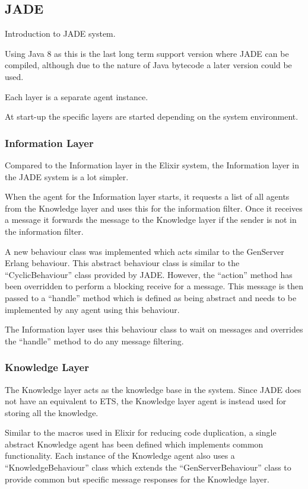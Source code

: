 \subsection{JADE}

Introduction to JADE system.

Using Java 8 as this is the last long term support version where JADE can be compiled, although due to the nature of Java bytecode a later version could be used.

Each layer is a separate agent instance.

At start-up the specific layers are started depending on the system environment.

\subsubsection{Information Layer}

Compared to the Information layer in the Elixir system, the Information layer in the JADE system is a lot simpler.

When the agent for the Information layer starts, it requests a list of all agents from the Knowledge layer and uses this for the information filter.
Once it receives a message it forwards the message to the Knowledge layer if the sender is not in the information filter.

A new behaviour class was implemented which acts similar to the GenServer Erlang behaviour.
This abstract behaviour class is similar to the ``CyclicBehaviour'' class provided by JADE\@.
However, the ``action'' method has been overridden to perform a blocking receive for a message.
This message is then passed to a ``handle'' method which is defined as being abstract and needs to be implemented by any agent using this behaviour.

The Information layer uses this behaviour class to wait on messages and overrides the ``handle'' method to do any message filtering.

\subsubsection{Knowledge Layer}

The Knowledge layer acts as the knowledge base in the system.
Since JADE does not have an equivalent to ETS, the Knowledge layer agent is instead used for storing all the knowledge.

Similar to the macros used in Elixir for reducing code duplication, a single abstract Knowledge agent has been defined which implements common functionality.
Each instance of the Knowledge agent also uses a ``KnowledgeBehaviour'' class which extends the ``GenServerBehaviour'' class to provide common but specific message responses for the Knowledge layer.

